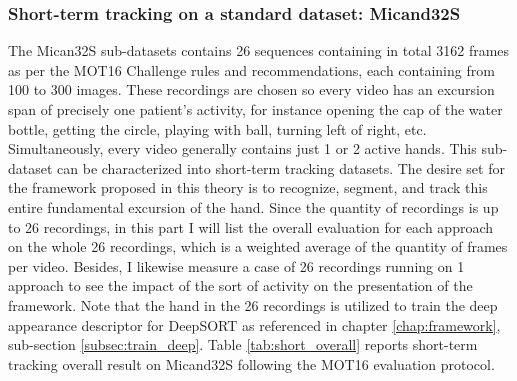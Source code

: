 \subsubsection{Short-term tracking on a standard dataset: Micand32S}
The Mican32S sub-datasets contains 26 sequences containing in total 3162 frames as per the MOT16 Challenge rules and recommendations, each containing from 100 to 300 images. These recordings are chosen so every video has an excursion span of precisely one patient’s activity, for instance opening the cap of the water bottle, getting the circle, playing with ball, turning left of right, etc. Simultaneously, every video generally contains just 1 or 2 active hands. This sub-dataset can be characterized into short-term tracking datasets. The desire set for the framework proposed in this theory is to recognize, segment, and track this entire fundamental excursion of the hand. Since the quantity of recordings is up to 26 recordings, in this part I will list the overall evaluation for each approach on the whole 26 recordings, which is a weighted average of the quantity of frames per video. Besides, I likewise measure a case of 26 recordings running on 1 approach to see the impact of the sort of activity on the presentation of the framework. Note that the hand in the 26 recordings is utilized to train the deep appearance descriptor for DeepSORT as referenced in chapter \ref{chap:framework}, sub-section \ref{subsec:train_deep}. Table \ref{tab:short_overall} reports short-term tracking overall result on Micand32S following the MOT16 evaluation protocol.

